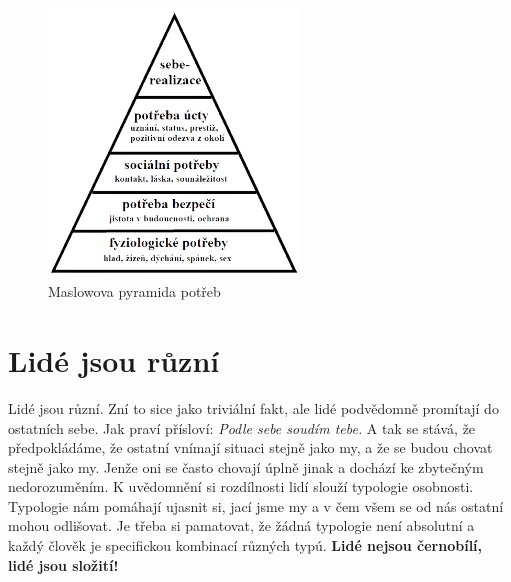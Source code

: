 \documentclass[a4paper,12pt]{report}
\begin{document}
\begin{figure}[hp!]
\pagelogos
\begin{center}
    \includegraphics[width=0.6\textwidth]{zdroje/maslowova-pyramida-lidskych-potreb.png}
    \caption{Maslowova pyramida potřeb}
    \label{Maslowova-pyramida-potreb}
\end{center} 
\end{figure}

\section{Lidé jsou různí}
\pagelogos
Lidé jsou různí. Zní to sice jako triviální fakt, ale lidé podvědomně promítají do ostatních sebe. Jak praví přísloví: \textit{Podle sebe soudím tebe.} A tak se stává, že předpokládáme, že ostatní vnímají situaci stejně jako my, a že se budou chovat stejně jako my.
Jenže oni se často chovají úplně jinak a dochází ke zbytečným nedorozuměním.
K uvědomnění si rozdílnosti lidí slouží typologie osobnosti. Typologie nám pomáhají ujasnit si, jací jsme my a v čem všem se od nás ostatní mohou odlišovat. Je třeba si pamatovat, že žádná typologie není absolutní a každý člověk je specifickou kombinací různých typú. \textbf{Lidé nejsou černobílí, lidé jsou složití!}
\end{document}
